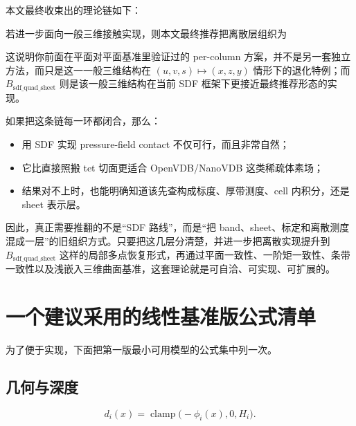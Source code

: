 \documentclass[12pt,a4paper]{ctexart}
\begin{document}
本文最终收束出的理论链如下：
\begin{center}
\end{center}

若进一步面向一般三维接触实现，则本文最终推荐把离散层组织为
\begin{center}
\end{center}
这说明你前面在平面对平面基准里验证过的 per-column 方案，并不是另一套独立方法，而只是这一一般三维结构在 $(u,v,s)\mapsto(x,z,y)$ 情形下的退化特例；而 $B_{\mathrm{sdf\_quad\_sheet}}$ 则是该一般三维结构在当前 SDF 框架下更接近最终推荐形态的实现。

如果把这条链每一环都闭合，那么：
\begin{itemize}
    \item 用 SDF 实现 pressure-field contact 不仅可行，而且非常自然；
    \item 它比直接照搬 tet 切面更适合 OpenVDB/NanoVDB 这类稀疏体素场；
    \item 结果对不上时，也能明确知道该先查构成标度、厚带测度、cell 内积分，还是 sheet 表示层。
\end{itemize}

因此，真正需要推翻的不是“SDF 路线”，而是“把 band、sheet、标定和离散测度混成一层”的旧组织方式。只要把这几层分清楚，并进一步把离散实现提升到 $B_{\mathrm{sdf\_quad\_sheet}}$ 这样的局部多点恢复形式，再通过平面一致性、一阶矩一致性、条带一致性以及浅嵌入三维曲面基准，这套理论就是可自洽、可实现、可扩展的。

\appendix
\section{一个建议采用的线性基准版公式清单}

为了便于实现，下面把第一版最小可用模型的公式集中列一次。

\subsection*{几何与深度}
\begin{equation}
    d_i(x)=\operatorname{clamp}\bigl(-\phi_i(x),0,H_i\bigr).
\end{equation}
\end{document}
